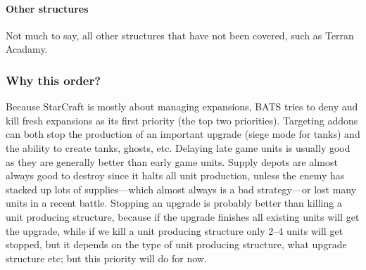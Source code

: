 \paragraph{Other structures \attackCoordinatorWeightsOtherStructure}
Not much to say, all other structures that have not been covered, such as Terran Acadamy.

\subsubsection{Why this order?}
Because StarCraft is mostly about managing expansions\cite{day9}, BATS tries to deny and kill fresh expansions as its first priority (the top two priorities). Targeting addons can both stop the production of an important upgrade (siege mode for tanks) and the ability to create tanks, ghosts, etc. Delaying late game units is usually good as they are generally better than early game units. Supply depots are almost always good to destroy since it halts all unit production, unless the enemy has stacked up lots of supplies—which almost always is a bad strategy—or lost many units in a recent battle. Stopping an upgrade is probably better than killing a unit producing structure, because if the upgrade finishes all existing units will get the upgrade, while if we kill a unit producing structure only 2–4 units will get stopped, but it depends on the type of unit producing structure, what upgrade structure etc; but this priority will do for now.